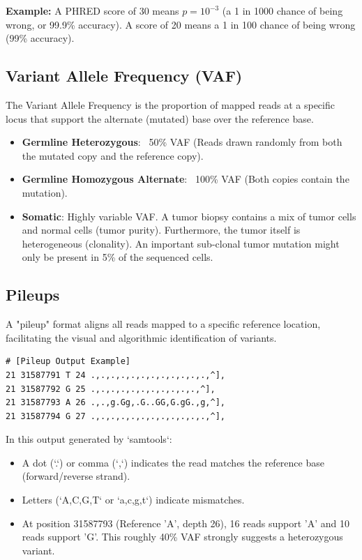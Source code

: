\documentclass[11pt,a4paper]{article}
\begin{document}
\textbf{Example:} A PHRED score of 30 means \( p = 10^{-3} \) (a 1 in 1000 chance of being wrong, or 99.9\% accuracy). A score of 20 means a 1 in 100 chance of being wrong (99\% accuracy).

\subsection{Variant Allele Frequency (VAF)}
The Variant Allele Frequency is the proportion of mapped reads at a specific locus that support the alternate (mutated) base over the reference base.

\begin{itemize}
    \item \textbf{Germline Heterozygous}: ~50\% VAF (Reads drawn randomly from both the mutated copy and the reference copy).
    \item \textbf{Germline Homozygous Alternate}: ~100\% VAF (Both copies contain the mutation).
    \item \textbf{Somatic}: Highly variable VAF. A tumor biopsy contains a mix of tumor cells and normal cells (tumor purity). Furthermore, the tumor itself is heterogeneous (clonality). An important sub-clonal tumor mutation might only be present in 5\% of the sequenced cells.
\end{itemize}

\subsection{Pileups}
A "pileup" format aligns all reads mapped to a specific reference location, facilitating the visual and algorithmic identification of variants.

\begin{verbatim}
# [Pileup Output Example]
21 31587791 T 24 .,.,.,.,.,.,.,.,.,.,.,.,^],
21 31587792 G 25 .,.,.,.,.,.,.,.,.,.,.,^],
21 31587793 A 26 .,.,g.Gg,.G..GG,G.gG.,g,^],
21 31587794 G 27 .,.,.,.,.,.,.,.,.,.,.,.,^],
\end{verbatim}

In this output generated by `samtools`:
\begin{itemize}
    \item A dot (`.`) or comma (`,`) indicates the read matches the reference base (forward/reverse strand).
    \item Letters (`A,C,G,T` or `a,c,g,t`) indicate mismatches.
    \item At position 31587793 (Reference 'A', depth 26), 16 reads support 'A' and 10 reads support 'G'. This roughly 40\% VAF strongly suggests a heterozygous variant.
\end{itemize}
\end{document}
